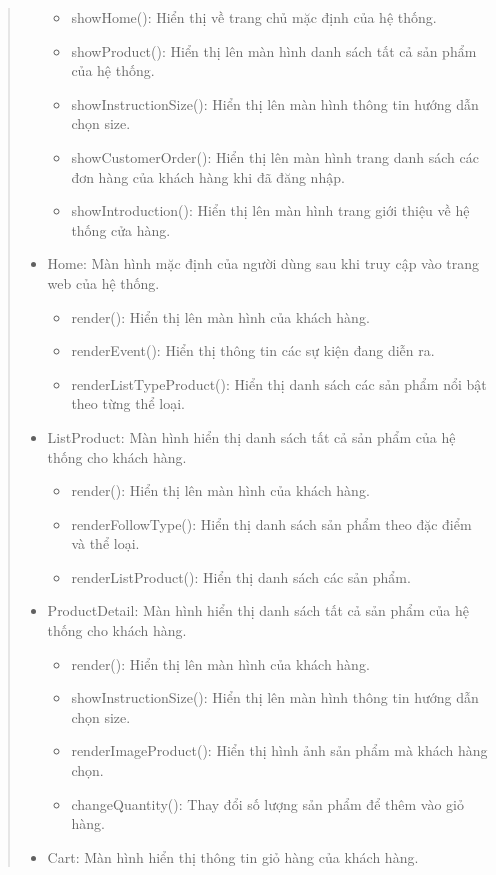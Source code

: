 \begin{quote}
\begin{itemize}
\begin{itemize}
				\item showHome(): Hiển thị về trang chủ mặc định của hệ thống.
				\item showProduct(): Hiển thị lên màn hình danh sách tất cả sản phẩm của hệ thống.
				\item showInstructionSize(): Hiển thị lên màn hình thông tin hướng dẫn chọn size.
				\item showCustomerOrder(): Hiển thị lên màn hình trang danh sách các đơn hàng của khách hàng khi đã đăng nhập.
				\item showIntroduction(): Hiển thị lên màn hình trang giới thiệu về hệ thống cửa hàng.
			\end{itemize}
		\item Home: Màn hình mặc định của người dùng sau khi truy cập vào trang web của hệ thống.
			\begin{itemize}
				\item render(): Hiển thị lên màn hình của khách hàng.
				\item renderEvent(): Hiển thị thông tin các sự kiện đang diễn ra.
				\item renderListTypeProduct(): Hiển thị danh sách các sản phẩm nổi bật theo từng thể loại.
			\end{itemize}
		\item ListProduct: Màn hình hiển thị danh sách tất cả sản phẩm của hệ thống cho khách hàng.
			\begin{itemize}
				\item render(): Hiển thị lên màn hình của khách hàng.
				\item renderFollowType(): Hiển thị danh sách sản phẩm theo đặc điểm và thể loại.
				\item renderListProduct(): Hiển thị danh sách các sản phẩm.
			\end{itemize}
		\item ProductDetail: Màn hình hiển thị danh sách tất cả sản phẩm của hệ thống cho khách hàng.
			\begin{itemize}
				\item render(): Hiển thị lên màn hình của khách hàng.
				\item showInstructionSize(): Hiển thị lên màn hình thông tin hướng dẫn chọn size.
				\item renderImageProduct(): Hiển thị hình ảnh sản phẩm mà khách hàng chọn.
				\item changeQuantity(): Thay đổi số lượng sản phẩm để thêm vào giỏ hàng.
			\end{itemize}
		\item Cart: Màn hình hiển thị thông tin giỏ hàng của khách hàng.

\end{itemize}
\end{quote}
